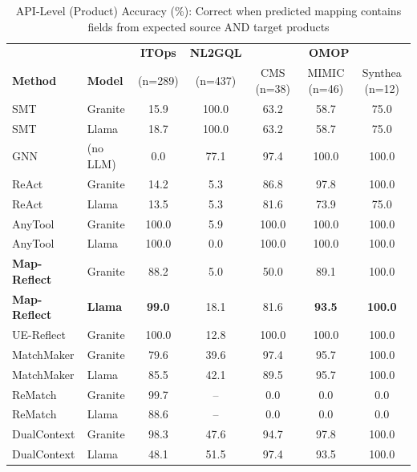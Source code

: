 \documentclass[sigconf, nonacm]{acmart}
\begin{document}
  \begin{table}[htbp]
  \centering
  \caption{API-Level (Product) Accuracy (\%): Correct when predicted mapping contains fields from expected source AND target products}
  \label{tab:api_accuracy}
  \begin{tabular}{ll|c|c|ccc}
  \toprule
  & & \textbf{ITOps} & \textbf{NL2GQL} & \multicolumn{3}{c}{\textbf{OMOP}} \\
  \textbf{Method} & \textbf{Model} & (n=289) & (n=437) & CMS (n=38) & MIMIC (n=46) & Synthea (n=12) \\
  \midrule
  SMT & Granite & 15.9 & 100.0 & 63.2 & 58.7 & 75.0 \\
  SMT & Llama & 18.7 & 100.0 & 63.2 & 58.7 & 75.0 \\
  \midrule
  GNN & (no LLM) & 0.0 & 77.1 & 97.4 & 100.0 & 100.0 \\
  \midrule
  ReAct & Granite & 14.2 & 5.3 & 86.8 & 97.8 & 100.0 \\
  ReAct & Llama & 13.5 & 5.3 & 81.6 & 73.9 & 75.0 \\
  \midrule
  AnyTool & Granite & 100.0 & 5.9 & 100.0 & 100.0 & 100.0 \\
  AnyTool & Llama & 100.0 & 0.0 & 100.0 & 100.0 & 100.0 \\
  \midrule
  \textbf{Map-Reflect} & Granite & 88.2 & 5.0 & 50.0 & 89.1 & 100.0 \\
  \textbf{Map-Reflect} & \textbf{Llama} & \textbf{99.0} & 18.1 & 81.6 & \textbf{93.5} & \textbf{100.0} \\
  \midrule
  UE-Reflect & Granite & 100.0 & 12.8 & 100.0 & 100.0 & 100.0 \\
  \midrule
  MatchMaker & Granite & 79.6 & 39.6 & 97.4 & 95.7 & 100.0 \\
  MatchMaker & Llama & 85.5 & 42.1 & 89.5 & 95.7 & 100.0 \\
  \midrule
  ReMatch & Granite & 99.7 & -- & 0.0 & 0.0 & 0.0 \\
  ReMatch & Llama & 88.6 & -- & 0.0 & 0.0 & 0.0 \\
  \midrule
  DualContext & Granite & 98.3 & 47.6 & 94.7 & 97.8 & 100.0 \\
  DualContext & Llama & 48.1 & 51.5 & 97.4 & 93.5 & 100.0 \\
  \bottomrule
  \end{tabular}
  \end{table}
\end{document}
